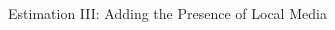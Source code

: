 \begin{frame}{Estimation III: Adding the Presence of Local Media}
\begin{columns}
\begin{column}{0.5\textwidth}
        
        \end{column}

    \end{columns}

\end{frame}